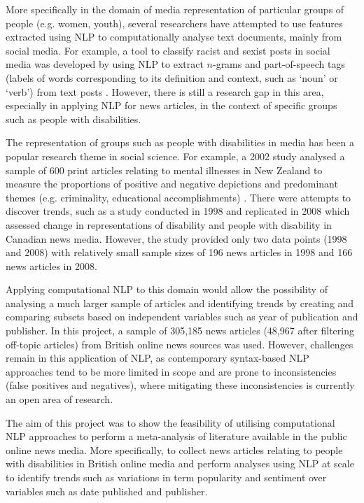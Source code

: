\documentclass{report}
\begin{document}
More specifically in the domain of media representation of particular groups of people (e.g. women, youth), several researchers have attempted to use features extracted using NLP to computationally analyse text documents, mainly from social media.
For example, a tool to classify racist and sexist posts in social media was developed by using NLP to extract $n$-grams and part-of-speech tags (labels of words corresponding to its definition and context, such as `noun' or `verb') from text posts \cite{waseem2016you}.
However, there is still a research gap in this area, especially in applying NLP for news articles, in the context of specific groups such as people with disabilities.

The representation of groups such as people with disabilities in media has been a popular research theme in social science.
For example, a 2002 study analysed a sample of 600 print articles relating to mental illnesses in New Zealand to measure the proportions of positive and negative depictions and predominant themes (e.g. criminality, educational accomplishments) \cite{coverdale2002depictions}.
There were attempts to discover trends, such as a study conducted in 1998 \cite{gold1999media} and replicated in 2008 \cite{devotta2013representations} which assessed change in representations of disability and people with disability in Canadian news media.
However, the study provided only two data points (1998 and 2008) with relatively small sample sizes of 196 news articles in 1998 and 166 news articles in 2008.

Applying computational NLP to this domain would allow the possibility of analysing a much larger sample of articles and identifying trends by creating and comparing subsets based on independent variables such as year of publication and publisher.
In this project, a sample of 305,185 news articles (48,967 after filtering off-topic articles) from British online news sources was used.
However, challenges remain in this application of NLP, as contemporary syntax-based NLP approaches tend to be more limited in scope and are prone to inconsistencies (false positives and negatives), where mitigating these inconsistencies is currently an open area of research. %

The aim of this project was to show the feasibility of utilising computational NLP approaches to perform a meta-analysis of literature available in the public online news media.
More specifically, to collect news articles relating to people with disabilities in British online media and perform analyses using NLP at scale to identify trends such as variations in term popularity and sentiment over variables such as date published and publisher.
\end{document}
